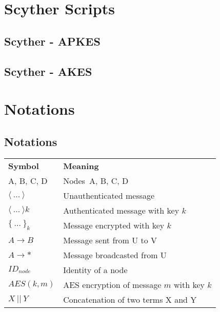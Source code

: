 \chapter{Scyther Scripts}
\label{app:listings}


\section{Scyther - APKES}
\label{app:apkes}



\section{Scyther - AKES}
\label{app:akes}




\chapter{Notations}

\section{Notations}
\label{app:notations}

\begin{tcolorbox}[title=Notations used in protocol specifications]
\begin{tabular}{ll}
\multicolumn{1}{p{1.3cm}}{\textbf{Symbol}} & \multicolumn{1}{p{4cm}}{\textbf{Meaning}}\\
A, B, C, D & Nodes\ A, B, C, D\\
$\langle{\ ...\ }\rangle{}$ & Unauthenticated message\\
$\langle{\ ...\ }\rangle{k}$ & Authenticated message with key $k$\\
$\{\ ...\ \}_k$ & Message encrypted with key $k$\\
$A \rightarrow B$ & Message sent from U to V\\
$A \rightarrow *$ & Message broadcasted from U\\
$ID_{node}$ & Identity of a node\\
$AES(k, m)$ & AES encryption of message $m$ with key $k$\\
$X\ ||\ Y$ & Concatenation of two terms X and Y\\ 
\end{tabular}
\end{tcolorbox}


